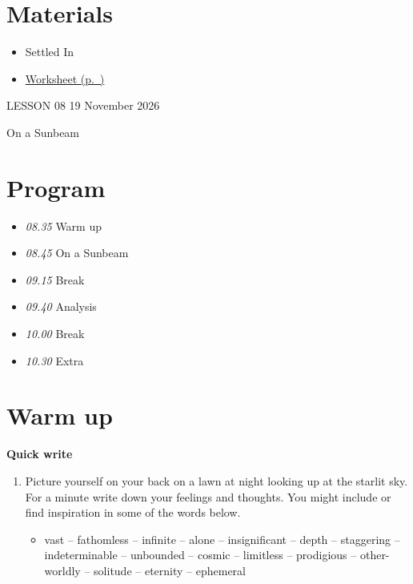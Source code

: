 \documentclass[11pt,a4paper,oneside]{book}
\newcommand{\tasktitle}[1]{{\color{blue}\bfseries #1}\par\smallskip}
\begin{document}
\section*{Materials}

\begin{itemize}
\item Settled In
\item \hyperref[worksheet-5]{Worksheet (p.~\pageref*{worksheet-5})}
\end{itemize}

\clearpage{}
{\color{blue}\small LESSON 08 \hfill 19 November 2026\par}
\vspace{4mm}
{\displayfont\color{navy}\fontsize{30}{34}\selectfont On a Sunbeam\par}\vspace{4mm}

\section*{Program}

\begin{itemize}
\item \emph{08.35} Warm up
\item \emph{08.45} On a Sunbeam
\item \emph{09.15} Break
\item \emph{09.40} Analysis
\item \emph{10.00} Break
\item \emph{10.30} Extra
\end{itemize}

\section*{Warm up}
\begin{taskbox}
\tasktitle{Quick write}
\begin{enumerate}
\item Picture yourself on your back on a lawn at night looking up at the starlit sky. For a minute write down your feelings and thoughts. You might include or find inspiration in some of the words below.

\begin{itemize}
\item vast – fathomless – infinite – alone – insignificant – depth – staggering – indeterminable – unbounded – cosmic – limitless – prodigious – other-worldly – solitude – eternity – ephemeral
\end{itemize}

\end{enumerate}
\end{taskbox}
\end{document}
